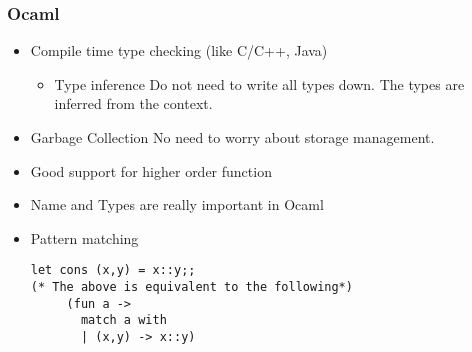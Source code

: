 \documentclass[11pt]{article}
\begin{document}
\subsubsection{Ocaml}
\label{sec:org1519363}
\begin{itemize}
\item Compile time type checking (like C/C++, Java)
\begin{itemize}
\item Type inference
Do not need to write all types down. The types are inferred from the
context.
\end{itemize}

\item Garbage Collection
No need to worry about storage management.

\item Good support for higher order function

\item Name and Types are really important in Ocaml

\item Pattern matching
\begin{verbatim}
let cons (x,y) = x::y;;
(* The above is equivalent to the following*)
     (fun a -> 
       match a with
       | (x,y) -> x::y)
\end{verbatim}
\end{itemize}
\end{document}
